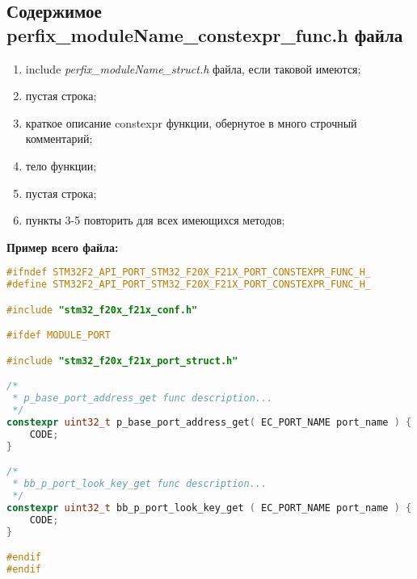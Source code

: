 \subsection{Содержимое perfix\_moduleName\_constexpr\_func.h файла}\label{p:conf:h}
\begin{enumerate}
	\item include \textit{perfix\_moduleName\_struct.h} файла, если таковой имеются;
	\item пустая строка;
	\item краткое описание constexpr функции, обернутое в много строчный комментарий;
	\item тело функции;
	\item пустая строка;
	\item пункты 3-5 повторить для всех имеющихся методов;
\end{enumerate}
\textbf{Пример всего файла:}\begin{lstlisting}[language=C++, frame=tlBR, basicstyle=\fontsize{10}{10}\ttfamily]
#ifndef STM32F2_API_PORT_STM32_F20X_F21X_PORT_CONSTEXPR_FUNC_H_
#define STM32F2_API_PORT_STM32_F20X_F21X_PORT_CONSTEXPR_FUNC_H_

#include "stm32_f20x_f21x_conf.h"

#ifdef MODULE_PORT

#include "stm32_f20x_f21x_port_struct.h"

/*
 * p_base_port_address_get func description...
 */
constexpr uint32_t p_base_port_address_get( EC_PORT_NAME port_name ) {
	CODE;
}

/*
 * bb_p_port_look_key_get func description...
 */
constexpr uint32_t bb_p_port_look_key_get ( EC_PORT_NAME port_name ) {
	CODE;
}

#endif
#endif
\end{lstlisting}


